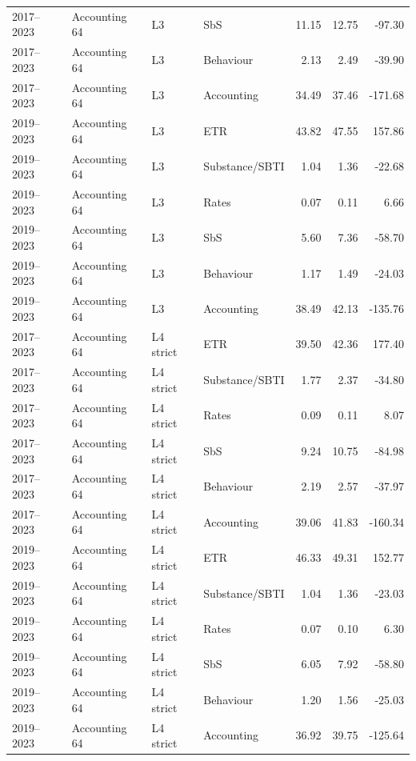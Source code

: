 \begin{table}[htbp]
\begin{tabular}{@{}llllrrr@{}}
2017–2023 & Accounting 64 & L3 & SbS & 11.15 & 12.75 &  -97.30 \\
2017–2023 & Accounting 64 & L3 & Behaviour &  2.13 &  2.49 &  -39.90 \\
2017–2023 & Accounting 64 & L3 & Accounting & 34.49 & 37.46 & -171.68 \\
2019–2023 & Accounting 64 & L3 & ETR & 43.82 & 47.55 &  157.86 \\
2019–2023 & Accounting 64 & L3 & Substance/SBTI &  1.04 &  1.36 &  -22.68 \\
2019–2023 & Accounting 64 & L3 & Rates &  0.07 &  0.11 &    6.66 \\
2019–2023 & Accounting 64 & L3 & SbS &  5.60 &  7.36 &  -58.70 \\
2019–2023 & Accounting 64 & L3 & Behaviour &  1.17 &  1.49 &  -24.03 \\
2019–2023 & Accounting 64 & L3 & Accounting & 38.49 & 42.13 & -135.76 \\
2017–2023 & Accounting 64 & L4 strict & ETR & 39.50 & 42.36 &  177.40 \\
2017–2023 & Accounting 64 & L4 strict & Substance/SBTI &  1.77 &  2.37 &  -34.80 \\
2017–2023 & Accounting 64 & L4 strict & Rates &  0.09 &  0.11 &    8.07 \\
2017–2023 & Accounting 64 & L4 strict & SbS &  9.24 & 10.75 &  -84.98 \\
2017–2023 & Accounting 64 & L4 strict & Behaviour &  2.19 &  2.57 &  -37.97 \\
2017–2023 & Accounting 64 & L4 strict & Accounting & 39.06 & 41.83 & -160.34 \\
2019–2023 & Accounting 64 & L4 strict & ETR & 46.33 & 49.31 &  152.77 \\
2019–2023 & Accounting 64 & L4 strict & Substance/SBTI &  1.04 &  1.36 &  -23.03 \\
2019–2023 & Accounting 64 & L4 strict & Rates &  0.07 &  0.10 &    6.30 \\
2019–2023 & Accounting 64 & L4 strict & SbS &  6.05 &  7.92 &  -58.80 \\
2019–2023 & Accounting 64 & L4 strict & Behaviour &  1.20 &  1.56 &  -25.03 \\
2019–2023 & Accounting 64 & L4 strict & Accounting & 36.92 & 39.75 & -125.64 \\
\bottomrule
\end{tabular}
\par\vspace{0.6em}
\begin{tabular}{@{}llrrrr@{}}

\end{tabular}
\end{table}
